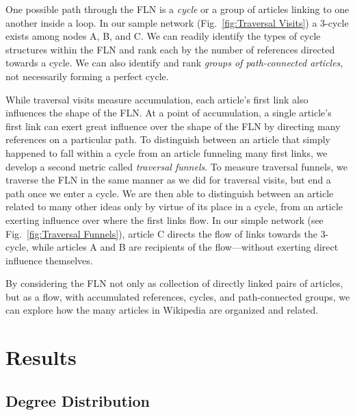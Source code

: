 \documentclass[pre,twocolumn,twoside,superscriptaddress,floatfix]{revtex4-1}
\begin{document}
{One possible path through the FLN is a {\it cycle} or a group of articles 
linking to one another inside a loop. In our sample network 
(Fig.~\ref{fig:Traversal Visits}) 
a 3-cycle exists among nodes A, B, and C. 
We can readily identify
the types of cycle structures within the FLN
and rank each by 
the number of references directed towards a cycle. 
We can also identify and rank {\it groups of 
path-connected articles}, not necessarily forming a perfect cycle.

While traversal visits measure accumulation, each article's first link also 
influences the shape of the FLN. 
At a point of accumulation, a single article's first link 
can exert great influence over the shape of the FLN by directing many
references on a particular path. To distinguish between an article 
that simply happened to fall within a cycle from an article funneling 
many first links, we develop a second metric called {\it traversal funnels}.
To measure traversal funnels, we traverse the FLN in the same manner as we 
did for traversal visits, but end a path once we enter a cycle.
We are then able to distinguish between an article related to many other ideas
only by virtue of its place in a cycle, from an article exerting influence over where the first links flow. 
In our simple network 
(see Fig.~\ref{fig:Traversal Funnels}), article C 
directs the flow of links towards the 3-cycle, while articles A and B are 
recipients of the flow---without exerting direct influence themselves. 

By considering the FLN not only as collection of directly linked pairs of articles, but
as a flow, with accumulated references, cycles, and path-connected groups, we can explore how the many articles in Wikipedia are organized and related.

\section{Results}

\subsection{Degree Distribution}

}
\end{document}
